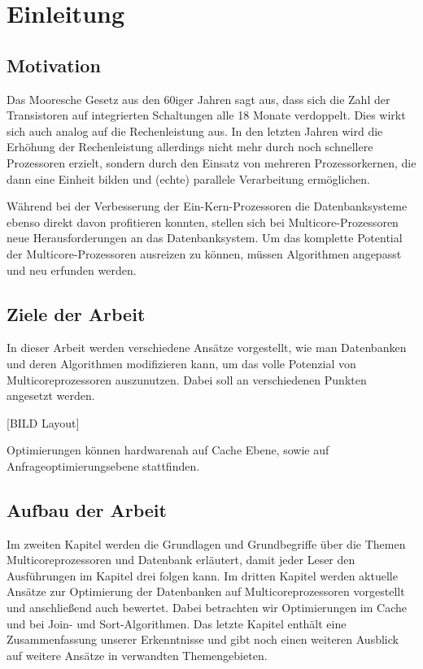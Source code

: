\chapter{Einleitung}
\label{sec:Einleitung}

\section{Motivation}
\label{sec:Motivation}
Das Mooresche Gesetz aus den 60iger Jahren sagt aus, dass sich die Zahl der Transistoren auf integrierten Schaltungen alle 18 Monate verdoppelt. Dies wirkt sich auch analog auf die Rechenleistung aus. In den letzten Jahren wird die Erhöhung der Rechenleistung allerdings nicht mehr durch noch schnellere Prozessoren erzielt, sondern durch den Einsatz von mehreren Prozessorkernen, die dann eine Einheit bilden und (echte) parallele Verarbeitung ermöglichen.

Während bei der Verbesserung der Ein-Kern-Prozessoren die Datenbanksysteme ebenso direkt davon profitieren konnten, stellen sich bei Multicore-Prozessoren neue Herausforderungen an das Datenbanksystem. Um das komplette Potential der Multicore-Prozessoren ausreizen zu können, müssen Algorithmen angepasst und neu erfunden werden.

\section{Ziele der Arbeit}
\label{sec:ZieleDerArbeit}
In dieser Arbeit werden verschiedene Ansätze vorgestellt, wie man Datenbanken und deren Algorithmen modifizieren kann, um das volle Potenzial von Multicoreprozessoren auszunutzen. Dabei soll an verschiedenen Punkten angesetzt werden. 

[BILD Layout]

Optimierungen können hardwarenah auf Cache Ebene, sowie auf Anfrageoptimierungsebene stattfinden.

\section{Aufbau der Arbeit}
\label{sec:AufbauDerArbeit}
Im zweiten Kapitel werden die Grundlagen und Grundbegriffe über die Themen Multicoreprozessoren und Datenbank erläutert, damit jeder Leser den Ausführungen im Kapitel drei folgen kann. Im dritten Kapitel werden aktuelle Ansätze zur Optimierung der Datenbanken auf Multicoreprozessoren vorgestellt und anschließend auch bewertet. Dabei betrachten wir Optimierungen im Cache und bei Join- und Sort-Algorithmen. Das letzte Kapitel enthält eine Zusammenfassung unserer Erkenntnisse und gibt noch einen weiteren Ausblick auf weitere Ansätze in verwandten Themengebieten.